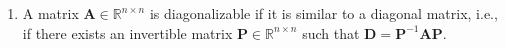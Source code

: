 \begin{enumerate}
    \item 
    \begin{definition}[Diagonalizable]
        A matrix $\bm{A} \in \mathbb{R}^{n\times n}$ is diagonalizable if it is similar to a diagonal matrix, i.e., if there exists an invertible matrix $\bm{P} \in \mathbb{R}^{n\times n}$ such that $\bm{D} = \bm{P}^{-1}\bm{AP}$.
        \hfill \cite{mfml/book/mml/Deisenroth-Faisal-Ong}
    \end{definition}
\end{enumerate}














